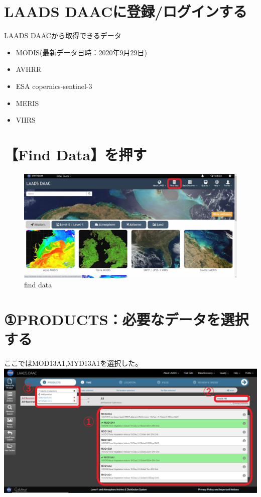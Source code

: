 \documentclass[
]{book}
\begin{document}
\hypertarget{laads-daacux306bux767bux9332ux30edux30b0ux30a4ux30f3ux3059ux308b}{%
\section{LAADS DAACに登録/ログインする}\label{laads-daacux306bux767bux9332ux30edux30b0ux30a4ux30f3ux3059ux308b}}

LAADS DAACから取得できるデータ　　

\begin{itemize}
\item
  MODIS(最新データ日時：2020年9月29日) 　
\item
  AVHRR
\item
  ESA copernics-sentinel-3
\item
  MERIS
\item
  VIIRS
\end{itemize}

\hypertarget{find-dataux3092ux62bcux3059}{%
\section{【Find Data】を押す}\label{find-dataux3092ux62bcux3059}}

\begin{figure}
\centering
\includegraphics{images/LD-1.png}
\caption{find data}
\end{figure}

\hypertarget{productsux5fc5ux8981ux306aux30c7ux30fcux30bfux3092ux9078ux629eux3059ux308b}{%
\section{①PRODUCTS：必要なデータを選択する}\label{productsux5fc5ux8981ux306aux30c7ux30fcux30bfux3092ux9078ux629eux3059ux308b}}

ここではMOD13A1,MYD13A1を選択した。
\includegraphics{images/LD-2.png}
\end{document}
